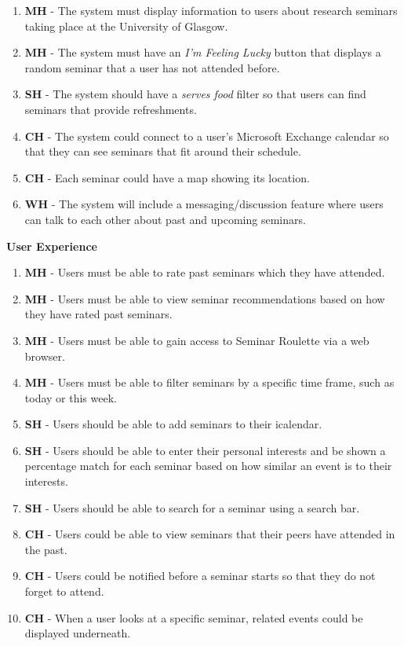 \documentclass{l4proj}
\begin{document}
\begin{enumerate}[label=S\arabic*]
    \item\label{functional_requirement:seminar_information} \textbf{MH} - The system must display information to users about research seminars taking place at the University of Glasgow.
    \item \textbf{MH} - The system must have an \emph{I'm Feeling Lucky} button that displays a random seminar that a user has not attended before.
    \item \textbf{SH} - The system should have a \emph{serves food} filter so that users can find seminars that provide refreshments.
    \item \textbf{CH} - The system could connect to a user's Microsoft Exchange calendar so that they can see seminars that fit around their schedule.
    \item \textbf{CH} - Each seminar could have a map showing its location.
    \item \textbf{WH} - The system will include a messaging/discussion feature where users can talk to each other about past and upcoming seminars.
\end{enumerate}

\textbf{User Experience}

\begin{enumerate}[label=U\arabic*]
    \item\label{functional_requirement:rate_seminar} \textbf{MH} - Users must be able to rate past seminars which they have attended.
    \item\label{functional_requirement:seminar_recommendations} \textbf{MH} - Users must be able to view seminar recommendations based on how they have rated past seminars.
    \item \textbf{MH} - Users must be able to gain access to Seminar Roulette via a web browser.
    \item\label{functional_requirement:time_filters} \textbf{MH} - Users must be able to filter seminars by a specific time frame, such as today or this week.
    \item\label{functional_requirement:calendar} \textbf{SH} - Users should be able to add seminars to their icalendar.
    \item\label{functional_requirement:personal_interests} \textbf{SH} - Users should be able to enter their personal interests and be shown a percentage match for each seminar based on how similar an event is to their interests.
    \item\label{functional_requirement:search_bar} \textbf{SH} - Users should be able to search for a seminar using a search bar.
    \item \textbf{CH} - Users could be able to view seminars that their peers have attended in the past.
    \item \textbf{CH} - Users could be notified before a seminar starts so that they do not forget to attend.
    \item \textbf{CH} - When a user looks at a specific seminar, related events could be displayed underneath.
\end{enumerate}
\end{document}
